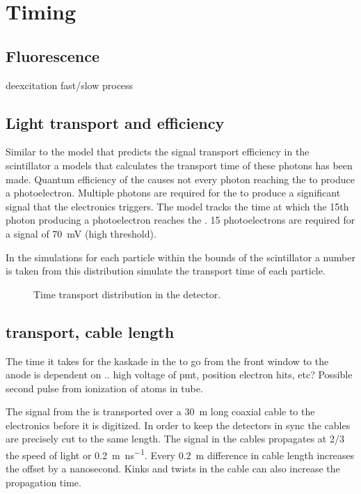 \section{Timing}


\subsection{Fluorescence}

deexcitation fast/slow process


\subsection{Light transport and \pmt efficiency}

Similar to the model that predicts the signal transport efficiency in
the scintillator a models that calculates the transport time of these
photons has been made. Quantum efficiency of the \pmt causes not every
photon reaching the \pmt to produce a photoelectron. Multiple photons
are required for the \pmt to produce a significant signal that the
\hisparc electronics triggers. The model tracks the time at which the
15th photon producing a photoelectron reaches the \pmt. 15
photoelectrons are required for a signal of \SI{70}{\milli\volt} (high
threshold).

In the simulations for each particle within the bounds of the
scintillator a number is taken from this distribution simulate the
transport time of each particle.

\begin{figure}
    \centering
    
    \caption{ Time transport
             distribution in the detector.}
    \label{fig:transport_time}
\end{figure}


\subsection{\pmt transport, cable length}

The time it takes for the kaskade in the \pmt to go from the front
window to the anode is dependent on .. high voltage of pmt, position
electron hits, etc? Possible second pulse from ionization of atoms in
tube.

The signal from the \pmt is transported over a \SI{30}{\meter} long
coaxial cable to the \hisparc electronics before it is digitized. In
order to keep the detectors in sync the cables are precisely cut to the
same length. The signal in the cables propagates at 2/3 the speed of
light or \SI{.2}{\meter\per\nano\second}. Every \SI{.2}{\meter}
difference in cable length increases the offset by a nanosecond. Kinks
and twists in the cable can also increase the propagation time.


